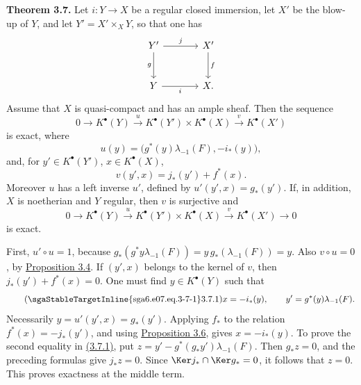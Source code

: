 \textbf{Theorem 3.7.} Let \(i:Y\to X\) be a regular closed immersion, let \(X'\) be the blow-up of \(Y\), and let \(Y'=X'\times_XY\), so that one has
\[
\begin{tikzcd}[column sep=large,row sep=large]
Y' \arrow[r,"j"] \arrow[d,"g"'] & X' \arrow[d,"f"]\\
Y \arrow[r,"i"'] & X.
\end{tikzcd}
\]
Assume that \(X\) is quasi-compact and has an ample sheaf. Then the sequence
\begin{equation}\tag{3.7.0}
0\to K^\bullet(Y)\xrightarrow{u}K^\bullet(Y')\times K^\bullet(X)\xrightarrow{v}K^\bullet(X')
\end{equation}
is exact, where
\begin{equation}\tag{3.7.u}
u(y)=\bigl(g^*(y)\lambda_{-1}(F),-i_*(y)\bigr),
\end{equation}
and, for \(y'\in K^\bullet(Y')\), \(x\in K^\bullet(X)\),
\begin{equation}\tag{3.7.v}
v(y',x)=j_*(y')+f^*(x).
\end{equation}
Moreover \(u\) has a left inverse \(u'\), defined by \(u'(y',x)=g_*(y')\). If, in addition, \(X\) is noetherian and \(Y\) regular, then \(v\) is surjective and
\begin{equation}\tag{3.7.2}
0\to K^\bullet(Y)\xrightarrow{u}K^\bullet(Y')\times K^\bullet(X)\xrightarrow{v}K^\bullet(X')\to0
\end{equation}
is exact.

First, \(u'\circ u=1\), because \(g_*(g^*y\lambda_{-1}(F))=y\,g_*(\lambda_{-1}(F))=y\). Also \(v\circ u=0\), by \hyperlink{sga6.e07.prop.3-4}{Proposition 3.4}. If \((y',x)\) belongs to the kernel of \(v\), then \(j_*(y')+f^*(x)=0\). One must find \(y\in K^\bullet(Y)\) such that
\begin{equation}\tag{\sgaStableTargetInline{sga6.e07.eq.3-7-1}3.7.1}
x=-i_*(y),\qquad y'=g^*(y)\lambda_{-1}(F).
\end{equation}
Necessarily \(y=u'(y',x)=g_*(y')\). Applying \(f_*\) to the relation \(f^*(x)=-j_*(y')\), and using \hyperlink{sga6.e07.prop.3-6}{Proposition 3.6}, gives \(x=-i_*(y)\). To prove the second equality in \hyperlink{sga6.e07.eq.3-7-1}{(3.7.1)}, put \(z=y'-g^*(g_*y')\lambda_{-1}(F)\). Then \(g_*z=0\), and the preceding formulas give \(j_*z=0\). Since \(\Ker j_*\cap\Ker g_*=0\), it follows that \(z=0\). This proves exactness at the middle term.

